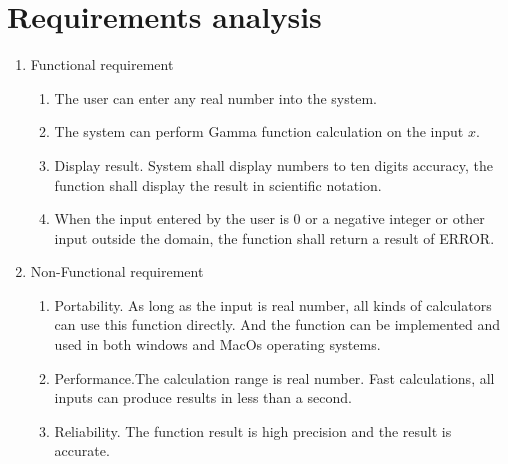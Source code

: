 \documentclass[12pt]{extarticle}
\newcommand{\<}{\langle}
\renewcommand{\>}{\rangle}
\theoremstyle{definition}
\begin{document}
\section{Requirements analysis}
\begin{enumerate}[\text{2.}1]
\item Functional requirement
\begin{enumerate}[\text{2.1.}1]
\item The user can enter any real number into the system.
\item The system can perform Gamma function calculation on the input $x$.
\item Display result. System shall display numbers to ten digits accuracy, the function shall display the result in scientific notation.
\item When the input entered by the user is 0 or a negative integer or other input outside the domain, the function shall return a result of ERROR.
\end{enumerate}
\item Non-Functional requirement
\begin{enumerate}[\text{2.2.}1]
\item Portability. As long as the input is real number, all kinds of calculators can use this function directly. And the function can be implemented and used in both windows and MacOs operating systems.
\item Performance.The calculation range is real number. Fast calculations, all inputs can produce results in less than a second.
\item Reliability. The function result is high precision and the result is accurate.
\end{enumerate}

\end{enumerate}
\end{document}

